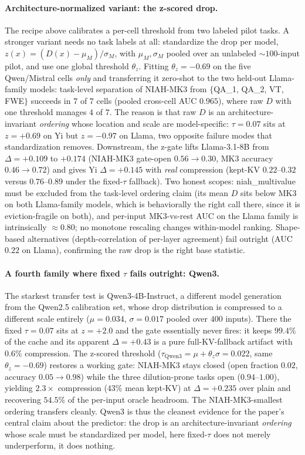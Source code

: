 \documentclass{article}
\begin{document}
\paragraph{Architecture-normalized variant: the z-scored drop.} The recipe
above calibrates a per-cell threshold from two labeled pilot tasks. A
stronger variant needs no task labels at all: standardize the drop
per model, $z(x) = (D(x) - \mu_M) / \sigma_M$, with $\mu_M, \sigma_M$
pooled over an unlabeled $\sim 100$-input pilot, and use one global
threshold $\theta_z$. Fitting $\theta_z = -0.69$ on the five Qwen/Mistral
cells \emph{only} and transferring it zero-shot to the two held-out
Llama-family models: task-level separation of NIAH-MK3 from
$\{$QA\_1, QA\_2, VT, FWE$\}$ succeeds in $7$ of $7$ cells (pooled
cross-cell AUC $0.965$), where raw $D$ with one threshold manages $4$ of
$7$. The reason is that raw $D$ is an architecture-invariant
\emph{ordering} whose location and scale are model-specific: $\tau = 0.07$
sits at $z = +0.69$ on Yi but $z = -0.97$ on Llama, two opposite failure
modes that standardization removes. Downstream, the z-gate lifts
Llama-3.1-8B from $\Delta = +0.109$ to $\boldsymbol{+0.174}$ (NIAH-MK3
gate-open $0.56 \to 0.30$, MK3 accuracy $0.46 \to 0.72$) and gives Yi
$\Delta = +0.145$ with \emph{real} compression (kept-KV $0.22$--$0.32$
versus $0.76$--$0.89$ under the fixed-$\tau$ fallback). Two honest
scopes: niah\_multivalue must be excluded from the task-level ordering
claim (its mean $D$ sits below MK3 on both Llama-family models, which
is behaviorally the right call there, since it is eviction-fragile on
both), and per-input MK3-vs-rest AUC on the Llama family is
intrinsically $\approx 0.80$; no monotone rescaling changes within-model
ranking. Shape-based alternatives (depth-correlation of per-layer
agreement) fail outright (AUC $0.22$ on Llama), confirming the raw drop
is the right base statistic.

\paragraph{A fourth family where fixed $\tau$ fails outright: Qwen3.} The
starkest transfer test is Qwen3-4B-Instruct, a different model generation
from the Qwen2.5 calibration set, whose drop distribution is compressed to
a different scale entirely ($\mu = 0.034$, $\sigma = 0.017$ pooled over
$400$ inputs). There the fixed $\tau = 0.07$ sits at $z = +2.0$ and the
gate essentially never fires: it keeps $99.4\%$ of the cache and its
apparent $\Delta = +0.43$ is a pure full-KV-fallback artifact with
$0.6\%$ compression. The z-scored threshold ($\tau_{\text{Qwen3}} = \mu +
\theta_z \sigma = 0.022$, same $\theta_z = -0.69$) restores a working
gate: NIAH-MK3 stays closed (open fraction $0.02$, accuracy $0.05 \to
0.98$) while the three dilution-prone tasks open ($0.94$--$1.00$),
yielding $2.3\times$ compression ($43\%$ mean kept-KV) at
$\Delta = +0.235$ over plain and recovering $54.5\%$ of the per-input
oracle headroom. The NIAH-MK3-smallest ordering transfers cleanly.
Qwen3 is thus the cleanest evidence for the paper's central claim about
the predictor: the drop is an architecture-invariant \emph{ordering}
whose scale must be standardized per model, here fixed-$\tau$ does not
merely underperform, it does nothing.
\end{document}
